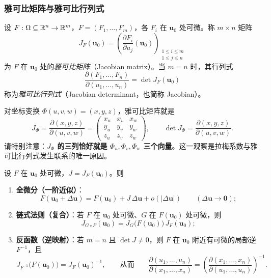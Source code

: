 \subsubsection{雅可比矩阵与雅可比行列式}

\begin{definition}[雅可比矩阵]
设 \(F:\Omega\subseteq\mathbb{R}^n\to\mathbb{R}^m\)，\(F=(F_1,\dots,F_m)\)，各 \(F_i\) 在 \(\mathbf{u}_0\) 处可微。称 \(m\times n\) 矩阵
\[
J_F(\mathbf{u}_0)=\left(\frac{\partial F_i}{\partial u_j}(\mathbf{u}_0)\right)_{\substack{1\le i\le m\\ 1\le j\le n}}
\]
为 \(F\) 在 \(\mathbf{u}_0\) 处的\emph{雅可比矩阵}（Jacobian matrix）。当 \(m=n\) 时，其行列式
\[
\frac{\partial(F_1,\dots,F_n)}{\partial(u_1,\dots,u_n)}=\det J_F(\mathbf{u}_0)
\]
称为\emph{雅可比行列式}（Jacobian determinant，也简称 Jacobian）。
\end{definition}

对坐标变换 \(\Phi(u,v,w)=(x,y,z)\)，雅可比矩阵就是
\[
J_\Phi=\frac{\partial(x,y,z)}{\partial(u,v,w)}
=\begin{pmatrix}
x_u & x_v & x_w\\[2pt]
y_u & y_v & y_w\\[2pt]
z_u & z_v & z_w
\end{pmatrix},
\qquad
\det J_\Phi=\frac{\partial(x,y,z)}{\partial(u,v,w)} .
\]
请特别注意：\textbf{\(J_\Phi\) 的三列恰好就是 \(\Phi_u,\Phi_v,\Phi_w\) 三个向量}。这一观察是拉梅系数与雅可比行列式发生联系的唯一原因。

\begin{theorem}[雅可比矩阵的三个基本作用]
设 \(F\) 在 \(\mathbf{u}_0\) 处可微，\(J=J_F(\mathbf{u}_0)\)。则
\begin{enumerate}[label=(\arabic*)]
  \item \textbf{全微分（一阶近似）}：
  \[
  F(\mathbf{u}_0+\Delta\mathbf{u})=F(\mathbf{u}_0)+J\,\Delta\mathbf{u}+o(|\Delta\mathbf{u}|)\qquad(\Delta\mathbf{u}\to\mathbf 0);
  \]
  \item \textbf{链式法则（复合）}：若 \(F\) 在 \(\mathbf{u}_0\) 处可微、\(G\) 在 \(F(\mathbf{u}_0)\) 处可微，则
  \[
  J_{G\circ F}(\mathbf{u}_0)=J_G\bigl(F(\mathbf{u}_0)\bigr)\,J_F(\mathbf{u}_0);
  \]
  \item \textbf{反函数（逆映射）}：若 \(m=n\) 且 \(\det J\ne0\)，则 \(F\) 在 \(\mathbf{u}_0\) 附近有可微的局部逆 \(F^{-1}\)，且
  \[
  J_{F^{-1}}\bigl(F(\mathbf{u}_0)\bigr)=J_F(\mathbf{u}_0)^{-1},
  \qquad\text{从而}\qquad
  \frac{\partial(u_1,\dots,u_n)}{\partial(x_1,\dots,x_n)}=\left(\frac{\partial(x_1,\dots,x_n)}{\partial(u_1,\dots,u_n)}\right)^{-1}.
  \]
\end{enumerate}
\end{theorem}


